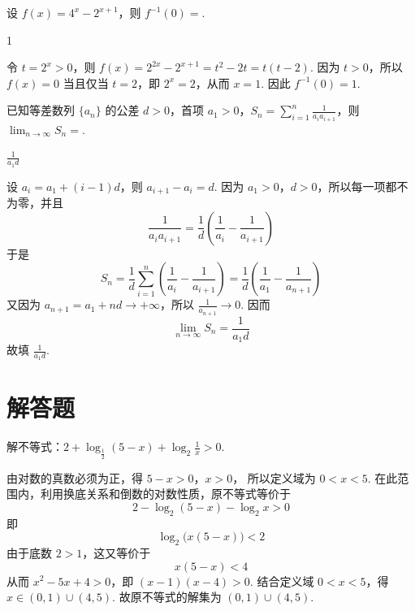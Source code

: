 \documentclass[UTF8,a4paper,oneside,11pt]{ctexbook}
\begin{document}
\begin{problem}
设 \(f(x) = 4^{x} - 2^{x + 1}\)，则 \(f^{-1}(0) =\)\fillinblank{}.
\end{problem}

\begin{answer}
1
\end{answer}

\begin{solution}
令 \(t=2^x>0\)，则
\(f(x)=2^{2x}-2^{x+1}=t^2-2t=t(t-2)\). 因为 \(t>0\)，所以
\(f(x)=0\) 当且仅当 \(t=2\)，即 \(2^x=2\)，从而 \(x=1\). 因此
\(f^{-1}(0)=1\).
\end{solution}

\begin{problem}
已知等差数列 \(\{a_{n}\}\) 的公差 \(d > 0\)，首项 \(a_{1} > 0\)，\(S_{n} = \sum_{i=1}^{n} \frac{1}{a_{i} a_{i+1}}\)，则 \(\displaystyle\lim_{n \to \infty} S_{n} =\)\fillinblank{}.
\end{problem}

\begin{answer}
\(\frac{1}{a_1d}\)
\end{answer}

\begin{solution}
设 \(a_i=a_1+(i-1)d\)，则 \(a_{i+1}-a_i=d\). 因为 \(a_1>0\)，\(d>0\)，所以每一项都不为零，并且
\[
\frac{1}{a_i a_{i+1}}=\frac{1}{d}\left(\frac{1}{a_i}-\frac{1}{a_{i+1}}\right)
\]
于是
\[
S_n=\frac{1}{d}\sum_{i=1}^{n}\left(\frac{1}{a_i}-\frac{1}{a_{i+1}}\right)=\frac{1}{d}\left(\frac{1}{a_1}-\frac{1}{a_{n+1}}\right)
\]
又因为 \(a_{n+1}=a_1+nd\to+\infty\)，所以 \(\frac{1}{a_{n+1}}\to0\). 因而
\[
\lim_{n\to\infty}S_n=\frac{1}{a_1d}
\]
故填 \(\frac{1}{a_1d}\).
\end{solution}

\section{解答题}

\begin{problem}
解不等式：\(2 + \log_{\frac{1}{2}}(5 - x) + \log_{2}\frac{1}{x} > 0\).
\end{problem}

\begin{solution}
由对数的真数必须为正，得 \(5-x>0\)，\(x>0\)，
所以定义域为 \(0<x<5\). 在此范围内，利用换底关系和倒数的对数性质，原不等式等价于
\[
2-\log_{2}(5-x)-\log_{2}x>0
\]
即
\[
\log_{2}\bigl(x(5-x)\bigr)<2
\]
由于底数 \(2>1\)，这又等价于
\[
x(5-x)<4
\]
从而 \(x^2-5x+4>0\)，即 \((x-1)(x-4)>0\). 结合定义域
\(0<x<5\)，得 \(x\in(0,1)\cup(4,5)\).
故原不等式的解集为 \((0,1)\cup(4,5)\).
\end{solution}
\end{document}

